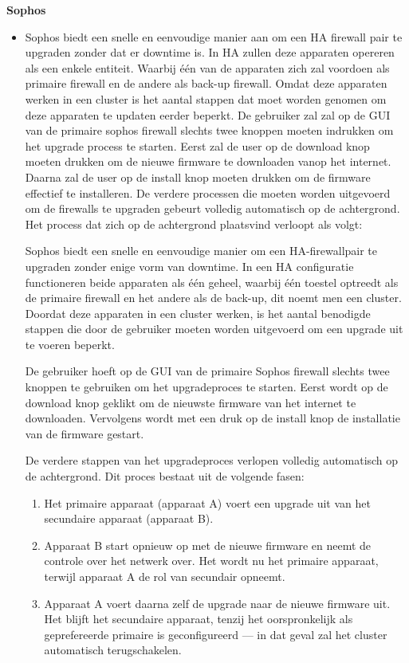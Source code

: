 \textbf{Sophos}
\begin{itemize}[label=\textbullet]
    \item Sophos biedt een snelle en eenvoudige manier aan om een HA firewall pair te upgraden zonder dat er downtime is. In HA zullen deze apparaten opereren als een enkele entiteit. Waarbij één van de apparaten zich zal voordoen als primaire firewall en de andere als back-up firewall. Omdat deze apparaten werken in een cluster is het aantal stappen dat moet worden genomen om deze apparaten te updaten eerder beperkt. De gebruiker zal zal op de GUI van de primaire sophos firewall slechts twee knoppen moeten indrukken om het upgrade process te starten. Eerst zal de user op de download knop moeten drukken om de nieuwe firmware te downloaden vanop het internet. Daarna zal de user op de install knop moeten drukken om de firmware effectief te installeren. De verdere processen die moeten worden uitgevoerd om de firewalls te upgraden gebeurt volledig automatisch op de achtergrond. Het process dat zich op de achtergrond plaatsvind verloopt als volgt:
    
\vspace{5mm}
    Sophos biedt een snelle en eenvoudige manier om een HA-firewallpair te upgraden zonder enige vorm van downtime. In een HA configuratie functioneren beide apparaten als één geheel, waarbij één toestel optreedt als de primaire firewall en het andere als de back-up, dit noemt men een cluster. Doordat deze apparaten in een cluster werken, is het aantal benodigde stappen die door de gebruiker moeten worden uitgevoerd om een upgrade uit te voeren beperkt.

\vspace{5mm}    
    De gebruiker hoeft op de GUI van de primaire Sophos firewall slechts twee knoppen te gebruiken om het upgradeproces te starten. Eerst wordt op de download knop geklikt om de nieuwste firmware van het internet te downloaden. Vervolgens wordt met een druk op de install knop de installatie van de firmware gestart.

\vspace{5mm}    
    De verdere stappen van het upgradeproces verlopen volledig automatisch op de achtergrond. Dit proces bestaat uit de volgende fasen:
    
    \begin{enumerate}
        \item Het primaire apparaat (apparaat A) voert een upgrade uit van het secundaire apparaat (apparaat B).
        \item Apparaat B start opnieuw op met de nieuwe firmware en neemt de controle over het netwerk over. Het wordt nu het primaire apparaat, terwijl apparaat A de rol van secundair opneemt.
        \item Apparaat A voert daarna zelf de upgrade naar de nieuwe firmware uit. Het blijft het secundaire apparaat, tenzij het oorspronkelijk als geprefereerde primaire is geconfigureerd — in dat geval zal het cluster automatisch terugschakelen.
    \end{enumerate}


\end{itemize}

